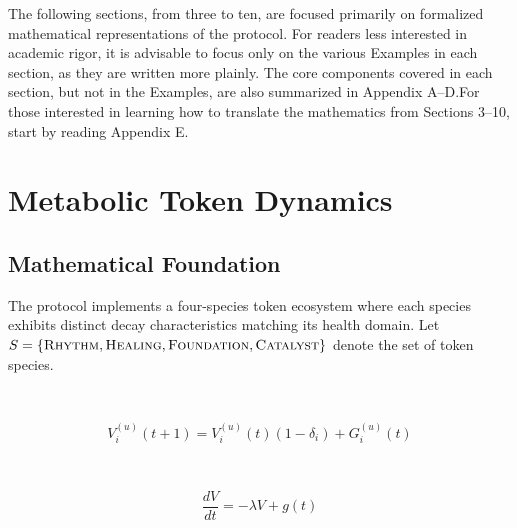 \documentclass[11pt,letterpaper]{article}
\newcommand{\tokenname}[1]{\textsc{#1}}
\begin{document}
The following sections, from three to ten, are focused primarily on formalized mathematical representations of the protocol. For readers less interested in academic rigor, it is advisable to focus only on the various Examples in each section, as they are written more plainly. The core components covered in each section, but not in the Examples, are also summarized in Appendix A–D.For those interested in learning how to translate the mathematics from Sections 3–10, start by reading Appendix E.

\section{Metabolic Token Dynamics}

\subsection{Mathematical Foundation}

The protocol implements a four-species token ecosystem where each species exhibits distinct decay characteristics matching its health domain. Let $S = \{\tokenname{Rhythm}, \tokenname{Healing}, \tokenname{Foundation}, \tokenname{Catalyst}\}$ denote the set of token species.

~


\begin{equation}
V_i^{(u)}(t+1) = V_i^{(u)}(t)(1 - \delta_i) + G_i^{(u)}(t)
\end{equation}


~


\begin{equation}
\frac{dV}{dt} = -\lambda V + g(t)
\end{equation}

\end{document}
